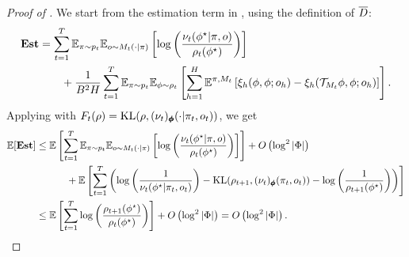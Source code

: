 \begin{proof}[Proof of ]
We start from the estimation term in , using the definition of $\overline{D}$:   
\begin{align*}
    \textbf{\textup{Est}} &= \sum_{t=1}^T \mathbb{E}_{\pi \sim p_t}\mathbb{E}_{o \sim M_t(\cdot|\pi)}\left[\log\left(\frac{\nu_t(\phi^\star|\pi, o)}{\rho_t(\phi^\star)}\right)\right] \\
    &\qquad + \frac{1}{B^2H} \sum_{t=1}^T\mathbb{E}_{\pi \sim p_t}\mathbb{E}_{\phi\sim \rho_t}\left[\sum_{h=1}^H \mathbb{E}^{\pi, M_t}\left[\xi_h(\phi, \phi; o_h) - \xi_h(\mathcal{T}_{M_t}\phi, \phi; o_h)\right]\right]. 
\end{align*}
Applying  with $F_t(\rho) = \text{KL}(\rho, (\nu_t)_{\pmb{\phi}} (\cdot|\pi_t, o_t) )$, we get 
\begin{align*}
   \mathbb{E}[\textbf{\textup{Est}}] &\leq \mathbb{E}\left[\sum_{t=1}^T \mathbb{E}_{\pi \sim p_t}\mathbb{E}_{o \sim M_t(\cdot|\pi)}\left[\log\left(\frac{\nu_t(\phi^\star|\pi, o)}{\rho_t(\phi^\star)}\right)\right] \right]  + O\left(\log^2|\Phi|\right) \\
   &\qquad \quad + \mathbb{E}\left[\sum_{t=1}^T \left(\log\left(\frac{1}{\nu_t(\phi^\star|\pi_t, o_t)}\right) - \text{KL}(\rho_{t+1}, (\nu_t)_{\pmb{\phi}} (\pi_t, o_t)) - \log\left(\frac{1}{\rho_{t+1}(\phi^\star)}\right)\right)\right] \\
   &\leq \mathbb{E}\left[\sum_{t=1}^T \log\left(\frac{\rho_{t+1}(\phi^\star)}{\rho_t(\phi^\star)}\right) \right]  + O\left( \log^2|\Phi|\right) = O\left( \log^2|\Phi|\right). 
\end{align*}
\end{proof}



